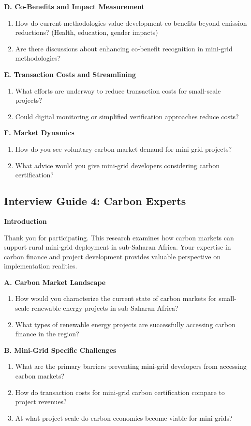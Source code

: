 \textbf{D. Co-Benefits and Impact Measurement}
\begin{enumerate}[resume]
	\item How do current methodologies value development co-benefits beyond emission reductions? (Health, education, gender impacts)
	\item Are there discussions about enhancing co-benefit recognition in mini-grid methodologies?
\end{enumerate}

\textbf{E. Transaction Costs and Streamlining}
\begin{enumerate}[resume]
	\item What efforts are underway to reduce transaction costs for small-scale projects?
	\item Could digital monitoring or simplified verification approaches reduce costs?
\end{enumerate}

\textbf{F. Market Dynamics}
\begin{enumerate}[resume]
	\item How do you see voluntary carbon market demand for mini-grid projects?
	\item What advice would you give mini-grid developers considering carbon certification?
\end{enumerate}

\subsection{Interview Guide 4: Carbon Experts}
\textbf{Introduction}

Thank you for participating. This research examines how carbon markets can support rural mini-grid deployment in sub-Saharan Africa. Your expertise in carbon finance and project development provides valuable perspective on implementation realities.

\textbf{A. Carbon Market Landscape}
\begin{enumerate}
	\item How would you characterize the current state of carbon markets for small-scale renewable energy projects in sub-Saharan Africa?
	\item What types of renewable energy projects are successfully accessing carbon finance in the region?
\end{enumerate}

\textbf{B. Mini-Grid Specific Challenges}
\begin{enumerate}[resume]
	\item What are the primary barriers preventing mini-grid developers from accessing carbon markets?
	\item How do transaction costs for mini-grid carbon certification compare to project revenues?
	\item At what project scale do carbon economics become viable for mini-grids?
\end{enumerate}

